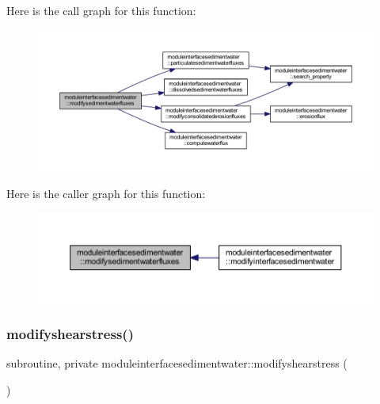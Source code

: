 Here is the call graph for this function\+:\nopagebreak
\begin{figure}[H]
\begin{center}
\leavevmode
\includegraphics[width=350pt]{namespacemoduleinterfacesedimentwater_a3c912328a57c38e146a0449318c3ace0_cgraph}
\end{center}
\end{figure}
Here is the caller graph for this function\+:\nopagebreak
\begin{figure}[H]
\begin{center}
\leavevmode
\includegraphics[width=350pt]{namespacemoduleinterfacesedimentwater_a3c912328a57c38e146a0449318c3ace0_icgraph}
\end{center}
\end{figure}
\mbox{\label{namespacemoduleinterfacesedimentwater_a959fd8b47379cd24947cb35417c1563e}} 
\subsubsection{\texorpdfstring{modifyshearstress()}{modifyshearstress()}}
{\footnotesize\ttfamily subroutine, private moduleinterfacesedimentwater\+::modifyshearstress (\begin{DoxyParamCaption}{ }\end{DoxyParamCaption})\hspace{0.3cm}{\ttfamily [private]}}

